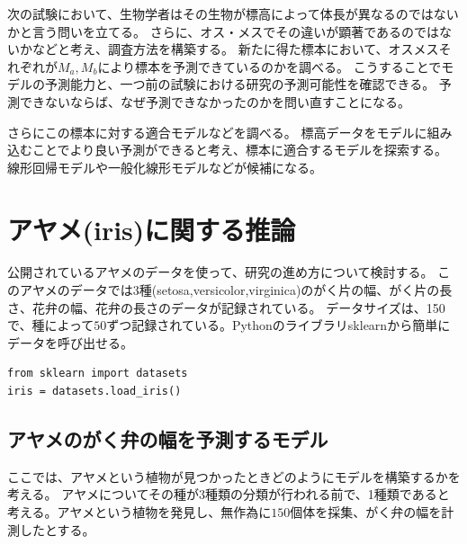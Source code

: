 次の試験において、生物学者はその生物が標高によって体長が異なるのではないかと言う問いを立てる。
さらに、オス・メスでその違いが顕著であるのではないかなどと考え、調査方法を構築する。
新たに得た標本において、オスメスそれぞれが$M_a,M_b$により標本を予測できているのかを調べる。
こうすることでモデルの予測能力と、一つ前の試験における研究の予測可能性を確認できる。
予測できないならば、なぜ予測できなかったのかを問い直すことになる。

さらにこの標本に対する適合モデルなどを調べる。
標高データをモデルに組み込むことでより良い予測ができると考え、標本に適合するモデルを探索する。
線形回帰モデルや一般化線形モデルなどが候補になる。


\section{アヤメ(iris)に関する推論}
公開されているアヤメのデータを使って、研究の進め方について検討する。
このアヤメのデータでは$3$種(setosa,versicolor,virginica)のがく片の幅、がく片の長さ、花弁の幅、花弁の長さのデータが記録されている。
データサイズは、150で、種によって$50$ずつ記録されている。Pythonのライブラリsklearnから簡単にデータを呼び出せる。
\begin{lstlisting}
from sklearn import datasets
iris = datasets.load_iris()
\end{lstlisting}

\subsection{アヤメのがく弁の幅を予測するモデル}
ここでは、アヤメという植物が見つかったときどのようにモデルを構築するかを考える。
アヤメについてその種が3種類の分類が行われる前で、1種類であると考える。アヤメという植物を発見し、無作為に$150$個体を採集、がく弁の幅を計測したとする。

